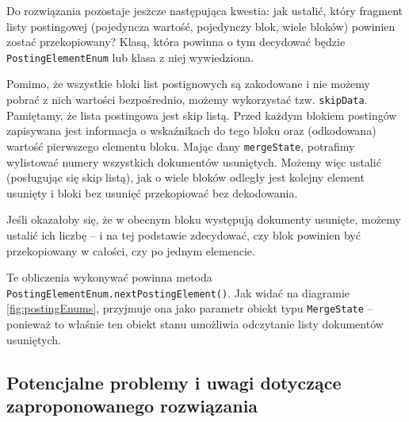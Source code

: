 Do rozwiązania pozostaje jeszcze następująca kwestia: jak ustalić, który fragment listy postingowej (pojedyncza wartość, pojedynczy blok, wiele bloków) powinien zostać przekopiowany? Klasą, która powinna o tym decydować będzie \texttt{PostingElementEnum} lub klasa z niej wywiedziona. 

Pomimo, że wszystkie bloki list postignowych są zakodowane i nie możemy pobrać z nich wartości bezpośrednio, możemy wykorzystać tzw. \texttt{skipData}. Pamiętamy, że lista postingowa jest skip listą. Przed każdym blokiem postingów zapisywana jest informacja o wskaźnikach do tego bloku oraz (odkodowana) wartość pierwszego elementu bloku. Mając dany \texttt{mergeState}, potrafimy wylistować numery wszystkich dokumentów usuniętych. Możemy więc ustalić (posługując się skip listą), jak o wiele bloków odległy jest kolejny element usunięty i bloki bez usunięć przekopiować bez dekodowania.

Jeśli okazałoby się, że w obecnym bloku występują dokumenty usunięte, możemy ustalić ich liczbę -- i na tej podstawie zdecydować, czy blok powinien być przekopiowany w całości, czy po jednym elemencie. 

Te obliczenia wykonywać powinna metoda \texttt{PostingElementEnum.nextPostingElement()}. Jak widać na diagramie \ref{fig:postingEnums}, przyjmuje ona jako parametr obiekt typu \texttt{MergeState} -- ponieważ to właśnie ten obiekt stanu umożliwia odczytanie listy dokumentów usuniętych.

\subsection{Potencjalne problemy i uwagi dotyczące zaproponowanego rozwiązania}

